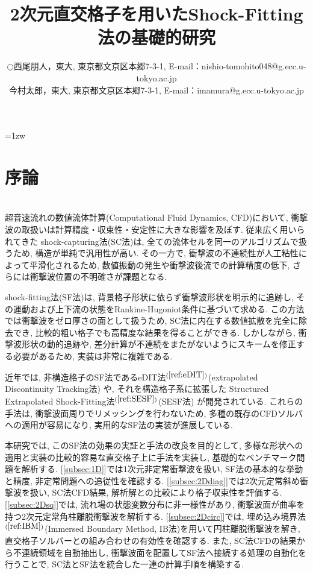\documentclass[a4j]{jarticle}
\title{2次元直交格子を用いたShock-Fitting法の基礎的研究}   %
\author{\begin{tabular}{cl}
$\bigcirc$ & 西尾朋人，東大, 
             東京都文京区本郷7-3-1, 
             E-mail：nishio-tomohito048@g.ecc.u-tokyo.ac.jp \\
           & 今村太郎，東大,
             東京都文京区本郷7-3-1, 
             E-mail：imamura@g.ecc.u-tokyo.ac.jp
\end{tabular} }
\begin{document}
\baselineskip=1zw
\maketitle

\section{序論} \label{sec:intro}
\mbox{}\\[-3.0ex]

超音速流れの数値流体計算(Computational Fluid Dynamics, CFD)において, 衝撃波の取扱いは計算精度・収束性・安定性に大きな影響を及ぼす.
従来広く用いられてきた shock-capturing法(SC法)は, 全ての流体セルを同一のアルゴリズムで扱うため, 構造が単純で汎用性が高い. 
その一方で, 衝撃波の不連続性が人工粘性によって平滑化されるため, 
数値振動の発生や衝撃波後流での計算精度の低下, さらには衝撃波位置の不明確さが課題となる.

shock-fitting法(SF法)は, 背景格子形状に依らず衝撃波形状を明示的に追跡し, 
その運動および上下流の状態をRankine-Hugoniot条件に基づいて求める.
この方法では衝撃波をゼロ厚さの面として扱うため, SC法に内在する数値拡散を完全に除去でき, 
比較的粗い格子でも高精度な結果を得ることができる. 
しかしながら, 衝撃波形状の動的追跡や, 差分計算が不連続をまたがないようにスキームを修正する必要があるため, 
実装は非常に複雑である.

近年では, 非構造格子のSF法であるeDIT法$^{(\ref{ref:eDIT})}$(extrapolated Discontinuity Tracking法) や, 
それを構造格子系に拡張した Structured Extrapolated Shock-Fitting法$^{(\ref{ref:SESF})}$(SESF法) が開発されている.
これらの手法は, 衝撃波面周りでリメッシングを行わないため,  
多種の既存のCFDソルバへの適用が容易になり, 実用的なSF法の実装が進展している.

本研究では, このSF法の効果の実証と手法の改良を目的として, 多様な形状への適用と実装の比較的容易な直交格子上に手法を実装し, 
基礎的なベンチマーク問題を解析する.
[\ref{subsec:1D}]では1次元非定常衝撃波を扱い, SF法の基本的な挙動と精度, 非定常問題への追従性を確認する.
[\ref{subsec:2Ddiag}]では2次元定常斜め衝撃波を扱い, SC法CFD結果, 解析解との比較により格子収束性を評価する.
[\ref{subsec:2Dsq}]では, 流れ場の状態変数分布に非一様性があり, 衝撃波面が曲率を持つ2次元定常角柱離脱衝撃波を解析する.
[\ref{subsec:2Dcirc}]では, 埋め込み境界法$^{(\ref{ref:IBM})}$(Immersed Boundary Method, IB法)を用いて円柱離脱衝撃波を解き,
直交格子ソルバーとの組み合わせの有効性を確認する.
また, SC法CFDの結果から不連続領域を自動抽出し, 衝撃波面を配置してSF法へ接続する処理の自動化を行うことで, 
SC法とSF法を統合した一連の計算手順を構築する.
\end{document}
